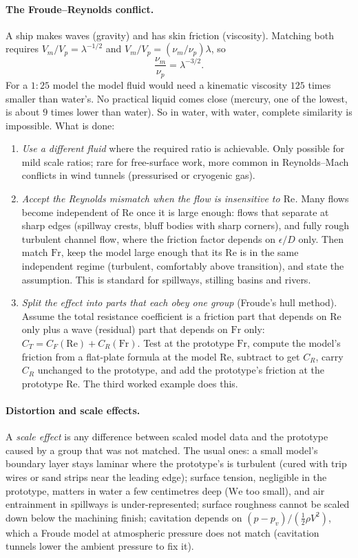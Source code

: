 \paragraph{The Froude--Reynolds conflict.} A ship makes waves (gravity) and has skin friction (viscosity). Matching both requires $V_m/V_p = \lambda^{-1/2}$ and $V_m/V_p = (\nu_m/\nu_p)\lambda$, so
\[
\frac{\nu_m}{\nu_p} = \lambda^{-3/2}.
\]
For a $1{:}25$ model the model fluid would need a kinematic viscosity $125$ times smaller than water's. No practical liquid comes close (mercury, one of the lowest, is about $9$ times lower than water). So in water, with water, complete similarity is impossible. What is done:
\begin{enumerate}[leftmargin=*]
\item \emph{Use a different fluid} where the required ratio is achievable. Only possible for mild scale ratios; rare for free-surface work, more common in Reynolds--Mach conflicts in wind tunnels (pressurised or cryogenic gas).
\item \emph{Accept the Reynolds mismatch when the flow is insensitive to $\mathrm{Re}$.} Many flows become independent of $\mathrm{Re}$ once it is large enough: flows that separate at sharp edges (spillway crests, bluff bodies with sharp corners), and fully rough turbulent channel flow, where the friction factor depends on $\epsilon/D$ only. Then match $\mathrm{Fr}$, keep the model large enough that its $\mathrm{Re}$ is in the same independent regime (turbulent, comfortably above transition), and state the assumption. This is standard for spillways, stilling basins and rivers.
\item \emph{Split the effect into parts that each obey one group} (Froude's hull method). Assume the total resistance coefficient is a friction part that depends on $\mathrm{Re}$ only plus a wave (residual) part that depends on $\mathrm{Fr}$ only: $C_T = C_F(\mathrm{Re}) + C_R(\mathrm{Fr})$. Test at the prototype $\mathrm{Fr}$, compute the model's friction from a flat-plate formula at the model $\mathrm{Re}$, subtract to get $C_R$, carry $C_R$ unchanged to the prototype, and add the prototype's friction at the prototype $\mathrm{Re}$. The third worked example does this.
\end{enumerate}

\paragraph{Distortion and scale effects.} A \emph{scale effect} is any difference between scaled model data and the prototype caused by a group that was not matched. The usual ones: a small model's boundary layer stays laminar where the prototype's is turbulent (cured with trip wires or sand strips near the leading edge); surface tension, negligible in the prototype, matters in water a few centimetres deep ($\mathrm{We}$ too small), and air entrainment in spillways is under-represented; surface roughness cannot be scaled down below the machining finish; cavitation depends on $(p - p_v)/(\tfrac12\rho V^2)$, which a Froude model at atmospheric pressure does not match (cavitation tunnels lower the ambient pressure to fix it).

